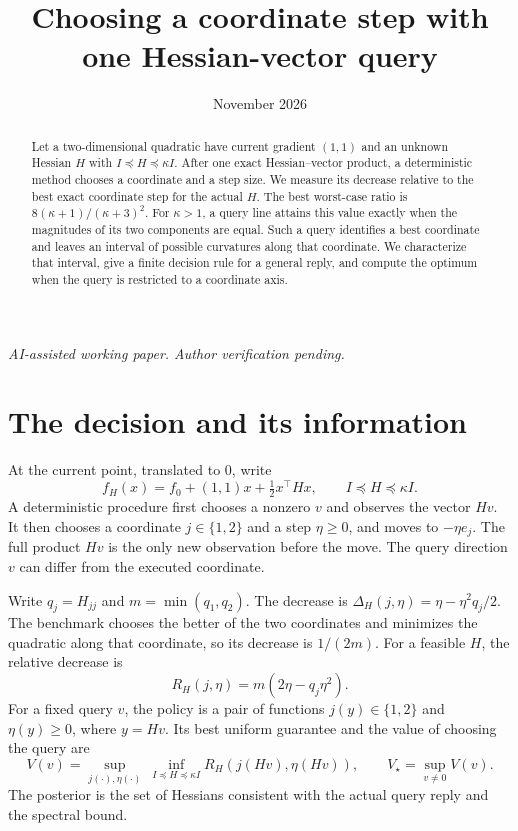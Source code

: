 \documentclass[11pt]{article}
\title{Choosing a coordinate step with one Hessian-vector query}
\author{}
\date{November 2026}
\begin{document}
\maketitle
\begin{center}\small\emph{AI-assisted working paper. Author verification pending.}\end{center}
\begin{abstract}
Let a two-dimensional quadratic have current gradient \((1,1)\) and
an unknown Hessian \(H\) with \(I\preceq H\preceq\kappa I\). After one
exact Hessian--vector product, a deterministic method chooses a coordinate and
a step size. We measure its decrease relative to the best exact
coordinate step for the actual \(H\). The best worst-case ratio is
\(8(\kappa+1)/(\kappa+3)^2\). For \(\kappa>1\), a query line attains this
value exactly when the magnitudes of its two components are equal.
Such a query identifies a best coordinate and leaves an interval of
possible curvatures along that coordinate. We characterize that interval, give
a finite decision rule for a general reply, and compute the optimum
when the query is restricted to a coordinate axis.
\end{abstract}

\section{The decision and its information}

At the current point, translated to \(0\), write
\[
 f_H(x)=f_0+(1,1)x+\tfrac12 x^\top Hx,\qquad I\preceq H\preceq\kappa I.
\]
A deterministic procedure first chooses a nonzero \(v\) and observes
the vector \(Hv\). It then chooses a coordinate \(j\in\{1,2\}\) and a
step \(\eta\ge0\), and moves to \(-\eta e_j\). The full product \(Hv\) is the only new observation before the
move.
The query direction \(v\) can differ from the executed coordinate.

Write \(q_j=H_{jj}\) and \(m=\min(q_1,q_2)\). The decrease is
\(\Delta_H(j,\eta)=\eta-\eta^2 q_j/2\). The benchmark chooses the
better of the two coordinates and minimizes the quadratic along that
coordinate, so its decrease is \(1/(2m)\). For a feasible \(H\), the relative decrease is
\begin{equation}
 R_H(j,\eta)=m(2\eta-q_j\eta^2).
 \label{eq:payoff}
\end{equation}
For a fixed query \(v\), the policy is a pair of functions
\(j(y)\in\{1,2\}\) and \(\eta(y)\ge0\), where \(y=Hv\). Its
best uniform guarantee and the value of choosing the query are
\[
 V(v)=\sup_{j(\cdot),\eta(\cdot)}
             \ \inf_{I\preceq H\preceq\kappa I}
                 R_H(j(Hv),\eta(Hv)),\qquad
 V_\star=\sup_{v\ne0}V(v).
\]
The posterior is the set of Hessians consistent with the actual
query reply and the spectral bound.
\end{document}
